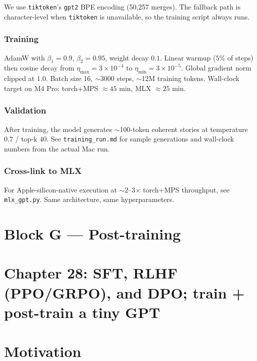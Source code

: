 \documentclass[11pt]{article}
\theoremstyle{remark}
\begin{document}
We use \texttt{tiktoken}'s \texttt{gpt2} BPE encoding (50{,}257 merges). The fallback path is character-level when \texttt{tiktoken} is unavailable, so the training script always runs.

\subsubsection*{Training}

AdamW with $\beta_1=0.9$, $\beta_2=0.95$, weight decay $0.1$. Linear warmup ($5\%$ of steps) then cosine decay from $\eta_{\max}=3\!\times\!10^{-4}$ to $\eta_{\min}=3\!\times\!10^{-5}$. Global gradient norm clipped at $1.0$. Batch size 16, $\sim$3000 steps, $\sim$12M training tokens. Wall-clock target on M4 Pro: torch+MPS $\approx 45$ min, MLX $\approx 25$ min.

\subsubsection*{Validation}

After training, the model generates $\sim$100-token coherent stories at temperature $0.7$ / top-k $40$. See \texttt{training\_run.md} for sample generations and wall-clock numbers from the actual Mac run.

\subsubsection*{Cross-link to MLX}

For Apple-silicon-native execution at $\sim$2--3$\times$ torch+MPS throughput, see \texttt{mlx\_gpt.py}. Same architecture, same hyperparameters.



\section*{Block G --- Post-training}

\section*{Chapter 28: SFT, RLHF (PPO/GRPO), and DPO; train + post-train a tiny GPT}

\section*{Motivation}
\end{document}

